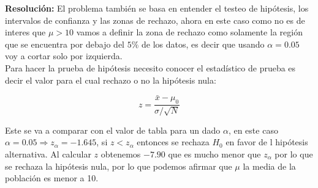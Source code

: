 \documentclass[twocolumn]{article}
\begin{document}
\textbf{Resolución:} El problema también se basa en entender el testeo de hipótesis, los intervalos de confianza y las zonas de rechazo, ahora en este caso como no es de interes que $ \mu>10 $ vamos a definir la zona de rechazo como solamente la región que se encuentra por debajo del $5\%$ de los datos, es decir que usando $\alpha=0.05$ voy a cortar solo por izquierda. \\
Para hacer la prueba de hipótesis necesito conocer el estadístico de prueba es decir el valor para el cual rechazo o no la hipótesis nula:

\[
z= \frac{\bar{x}-\mu_0}{\sigma/\sqrt{N}}
\]

Este se va a comparar con el valor de tabla para un dado $  \alpha$, en este caso $  \alpha=0.05 \Rightarrow z_{\alpha}=-1.645$, si $z<z_{\alpha}$ entonces se rechaza $H_0$ en favor de l hipótesis alternativa. 
Al calcular $ z$ obtenemos $ -7.90 $ que es mucho menor que $z_{\alpha}$ por lo que se rechaza la hipótesis nula, por lo que podemos afirmar que $\mu$ la media de la población es menor a 10. 
\end{document}
